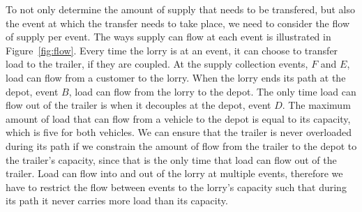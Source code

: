 To not only determine the amount of supply that needs to be transfered, but also the event at which the transfer needs to take place, we need to consider the flow of supply per event. The ways supply can flow at each event is illustrated in Figure~\ref{fig:flow}.
Every time the lorry is at an event, it can choose to transfer load to the trailer, if they are coupled.
At the supply collection events, $F$ and $E$,  load can flow from a customer to the lorry.
When the lorry ends its path at the depot, event $B$, load can flow from the lorry to the depot.
The only time load can flow out of the trailer is when it decouples at the depot, event $D$.
The maximum amount of load that can flow from a vehicle to the depot is equal to its capacity, which is five for both vehicles.
We can ensure that the trailer is never overloaded during its path if we constrain the amount of flow from the trailer to the depot to the trailer's capacity, since that is the only time that load can flow out of the trailer.
Load can flow into and out of the lorry at multiple events, therefore we have to restrict the flow between events to the lorry's capacity such that during its path it never carries more load than its capacity.
\\









%
%


